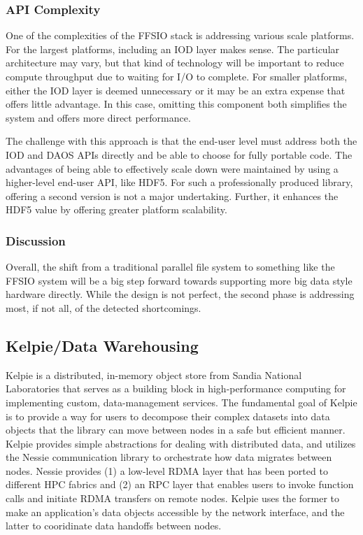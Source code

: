 \subsubsection{API Complexity}
One of the complexities of the FFSIO stack is addressing various scale
platforms. For the largest platforms, including an IOD layer makes sense. The
particular architecture may vary, but that kind of technology will be important
to reduce compute throughput due to waiting for I/O to complete. For smaller
platforms, either the IOD layer is deemed unnecessary or it may be an extra
expense that offers little advantage. In this case, omitting this component
both simplifies the system and offers more direct performance.

The challenge with this approach is that the end-user level must address both
the IOD and DAOS APIs directly and be able to choose for fully portable code.
The advantages of being able to effectively scale down were maintained by using
a higher-level end-user API, like HDF5. For such a professionally produced
library, offering a second version is not a major undertaking. Further, it
enhances the HDF5 value by offering greater platform scalability.

\subsubsection{Discussion}
Overall, the shift from a traditional parallel file system to something like
the FFSIO system will be a big step forward towards supporting more big data
style hardware directly. While the design is not perfect, the second phase is
addressing most, if not all, of the detected shortcomings. 

\subsection{Kelpie/Data Warehousing}

Kelpie is a distributed, in-memory object store from Sandia National
Laboratories that serves as a building block in high-performance computing for
implementing custom, data-management services. The fundamental goal of Kelpie
is to provide a way for users to decompose their complex datasets into data
objects that the library can move between nodes in a safe but efficient manner.
Kelpie provides simple abstractions for dealing with distributed data, and
utilizes the Nessie communication library to orchestrate how data migrates
between nodes. Nessie provides (1) a low-level RDMA layer that has been ported
to different HPC fabrics and (2) an RPC layer that enables users to invoke
function calls and initiate RDMA transfers on remote nodes. Kelpie uses the
former to make an application's data objects accessible by the network
interface, and the latter to cooridinate data handoffs between nodes.

